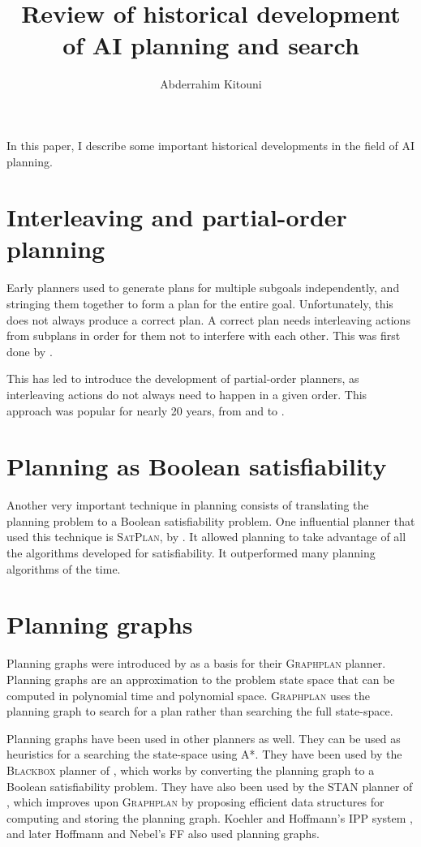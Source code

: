 \documentclass[11pt]{article}
\title{Review of historical development of AI planning and search}
\author{Abderrahim Kitouni}
\begin{document}
\maketitle

In this paper, I describe some important historical developments in the field of AI planning.
\section{Interleaving and partial-order planning}
Early planners used to generate plans for multiple subgoals independently, and stringing them together to form a plan for the entire goal. Unfortunately, this does not always produce a correct plan. A correct plan needs interleaving actions from subplans in order for them not to interfere with each other. This was first done by \textcite{waldinger1975achieving}.

This has led to introduce the development of partial-order planners, as interleaving actions do not always need to happen in a given order. This approach was popular for nearly 20 years, from \textcite{sacerdoti1975nonlinear} and \textcite{tate1977generating} to \textcite{penberthy1992ucpop}.


\section{Planning as Boolean satisfiability}
Another very important technique in planning consists of translating the planning problem to a Boolean satisfiability problem. One influential planner that used this technique is \textsc{SatPlan}, by \textcite{kautz1992planning,kautz1996pushing}. It allowed planning to take advantage of all the algorithms developed for satisfiability. It outperformed many planning algorithms of the time.

\section{Planning graphs}
Planning graphs were introduced by \textcite{blum1997fast} as a basis for their \textsc{Graphplan} planner. Planning graphs are an approximation to the problem state space that can be computed in polynomial time and polynomial space. \textsc{Graphplan} uses the planning graph to search for a plan rather than searching the full state-space.

Planning graphs have been used in other planners as well. They can be used as heuristics for a searching the state-space using A*. They have been used by the \textsc{Blackbox} planner of \textcite{kautz1998blackbox, kautz1999unifying}, which works by converting the planning graph to a Boolean satisfiability problem. They have also been used by the \textsc{STAN} planner of \textcite{long1999efficient}, which improves upon \textsc{Graphplan} by proposing efficient data structures for computing and storing the planning graph. Koehler and Hoffmann's IPP system \parencite{koehler1997extending}, and later Hoffmann and Nebel's FF \parencite{hoffmann2001ff} also used planning graphs.

\printbibliography
\end{document}
